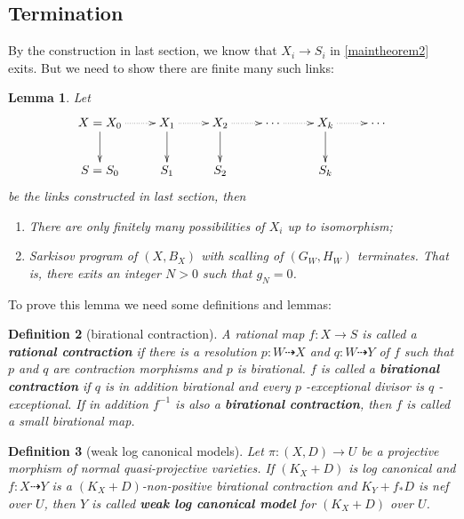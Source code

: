 \documentclass{article}
\newtheorem{defn}{Definition}[subsection]
\newtheorem{lem}[defn]{Lemma}
\begin{document}
\subsection{Termination}
By the construction in last section, we know that $X_{i}\to S_{i}$ in \ref{maintheorem2} exits. But we need to show there are finite many such links:
\begin{lem}\label{termination2}
  Let 
\[
  \xymatrix{
    X=X_0\ar@{.>}[r]\ar[d]&X_{1}\ar@{.>}[r]\ar[d]& X_{2}\ar@{.>}[r]\ar[d] &\cdots\ar@{.>}[r]&X_k\ar[d]\ar@{.>}[r]&\cdots \\
    S=S_{0}&S_{1} &S_{2}&&S_k
  }
\]
be the links constructed in last section, then 
  \begin{enumerate}
    \item There are only finitely many possibilities of $X_{i}$ up to isomorphism;
    \item Sarkisov program of $(X,B_{X})$ with scalling of $(G_{W},H_{W})$ terminates. That is, there exits an integer $N>0$ such that $g_{N}=0$.  
  \end{enumerate}
\end{lem}
To prove this lemma we need some definitions and lemmas:
\begin{defn}[birational contraction]
  A rational map $f:X\to S$ is called a \textbf{rational contraction} if there is a resolution $p:W\dashrightarrow X$  and $q:W\dashrightarrow Y$  of $f$  such that $p$  and $q$  are contraction morphisms and $p$  is birational. $f$ is called a \textbf{birational contraction} if $q$  is in addition birational and every $p$ -exceptional divisor is $q$ -exceptional. If in addition $f^{-1}$ is also a \textbf{birational contraction}, then $f$ is called a small birational map.
\end{defn}
\begin{defn}[weak log canonical models]\label{wlcm}
  Let $ \pi:(X,D)\to U $ be a projective morphism of normal quasi-projective varieties. If $(K_X+D)$ is log canonical and  $f:X\dashrightarrow Y $ is a $(K_X+D)$-non-positive birational contraction and $ K_Y+f_*D $ is nef over $ U $, then $ Y $ is called \textbf{ weak log canonical model} for $(K_X+D)$ over $ U $.
\end{defn}
\end{document}
